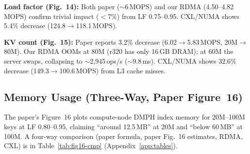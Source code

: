 \documentclass[conference]{IEEEtran}
\begin{document}
\textbf{Load factor (Fig.~14):} Both paper ($\sim$6\,MOPS) and our RDMA (4.50--4.82\,MOPS) confirm trivial impact ($<$7\%) from LF 0.75--0.95. CXL/NUMA shows 5.4\% decrease (124.8$\to$118.1\,MOPS).

\textbf{KV count (Fig.~15):} Paper reports 3.2\% decrease (6.02$\to$5.83\,MOPS, 20M$\to$80M). Our RDMA OOMs at 80M (r320 has only 16\,GB DRAM); at 60M the server swaps, collapsing to $\sim$2,945\,ops/s ($\sim$9.8\,ms). CXL/NUMA shows 32.6\% decrease (149.3$\to$100.6\,MOPS) from L3 cache misses.

\begin{table}[H]
\centering
\caption{Paper Figures~14--15 vs.\ RDMA reproduction vs.\ CXL/NUMA: sensitivity}
\label{tab:paper-fig14-15}
\scriptsize
{}
\end{table}

\subsection{Memory Usage (Three-Way, Paper Figure~16)}

The paper's Figure~16 plots compute-node DMPH index memory for 20M--100M keys at LF 0.80--0.95, claiming ``around 12.5\,MB'' at 20M and ``below 60\,MB'' at 100M. A four-way comparison (paper formula, paper Fig.~16 estimates, RDMA, CXL) is in Table~\ref{tab:fig16-cmp} (Appendix~\ref{app:tables}).
\end{document}
